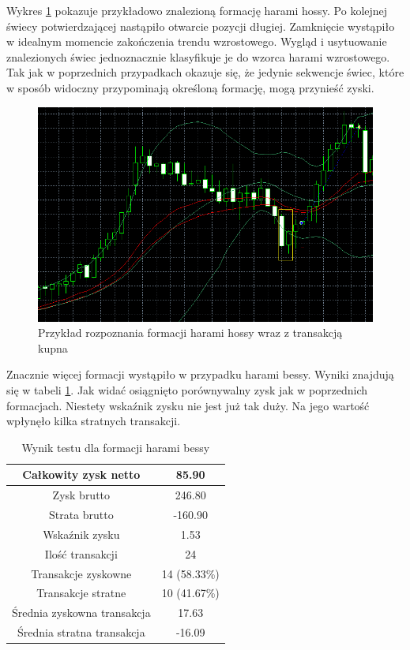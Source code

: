 \documentclass[pdflatex,11pt]{aghdpl}
\begin{document}
Wykres \ref{przyklad_harami_hossy} pokazuje przykładowo znalezioną formację harami hossy. Po kolejnej świecy potwierdzającej nastąpiło otwarcie pozycji długiej. Zamknięcie wystąpiło w idealnym momencie zakończenia trendu wzrostowego. Wygląd i usytuowanie znalezionych świec jednoznacznie klasyfikuje je do wzorca harami wzrostowego. Tak jak w poprzednich przypadkach okazuje się, że jedynie sekwencje świec, które w sposób widoczny przypominają określoną formację, mogą przynieść zyski. 
\begin{figure}[h!]
\begin{center}
\includegraphics[width=14cm]{bullishharami/przyklad.png}
\caption{Przykład rozpoznania formacji harami hossy wraz z transakcją kupna}
\label{przyklad_harami_hossy}
\end{center}
\end{figure} 
Znacznie więcej formacji wystąpiło w przypadku harami bessy. Wyniki znajdują się w tabeli \ref{raport_harami_bessy}. Jak widać osiągnięto porównywalny zysk jak w poprzednich formacjach. Niestety wskaźnik zysku nie jest już tak duży. Na jego wartość wpłynęło kilka stratnych transakcji. 
\begin{table}[h!]
\begin{center}
\begin{tabular}{|c|c|}
\hline 
Całkowity zysk netto & 85.90\\
\hline
Zysk brutto & 246.80 \\
\hline
Strata brutto & -160.90 \\
\hline
Wskaźnik zysku & 1.53 \\
\hline
\hline
Ilość transakcji & 24 \\
\hline
Transakcje zyskowne & 14 (58.33\%) \\
\hline
Transakcje stratne & 10 (41.67\%) \\
\hline
\hline
Średnia zyskowna transakcja & 17.63 \\
\hline
Średnia stratna transakcja & -16.09 \\
\hline
\end{tabular} 
\caption{Wynik testu dla formacji harami bessy}
\label{raport_harami_bessy}
\end{center}
\end{table}
\end{document}
